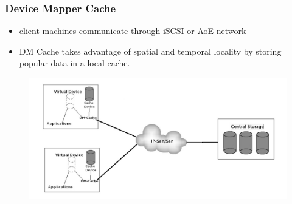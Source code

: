 \documentclass{beamer}
\begin{document}
\begin{frame}
	\frametitle{Device Mapper Cache}
	\begin{itemize}
		\item client machines communicate through iSCSI or AoE network
		\item DM Cache takes advantage of spatial and temporal locality
			by storing popular data in a local cache.
	\end{itemize}
	\begin{figure}
		\centering \includegraphics[scale=.30]{DMC.jpg}
		\label{fig:dmc}
	\end{figure}
\end{frame}
%
\end{document}
